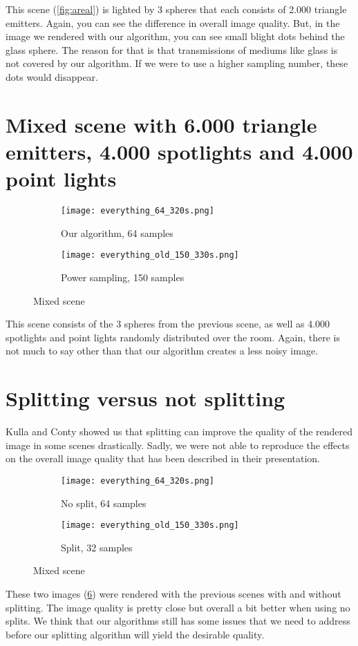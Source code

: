 This scene (\ref{fig:areal}) is lighted by 3 spheres that each consists of 2.000 triangle emitters. Again, you can see the difference in overall image quality. But, in the image we rendered with our algorithm, you can see small blight dots behind the glass sphere. The reason for that is that transmissions of mediums like glass is not covered by our algorithm. If we were to use a higher sampling number, these dots would disappear.

\section{Mixed scene with 6.000 triangle emitters, 4.000 spotlights and 4.000 point lights}

\begin{figure}
	\centering
	\begin{subfigure}{.5\textwidth}
		\centering
		\texttt{[image: everything\_64\_320s.png]}
		\caption{Our algorithm, 64 samples}
		\label{fig:every1}
	\end{subfigure}%
	\begin{subfigure}{.5\textwidth}
		\centering
		\texttt{[image: everything\_old\_150\_330s.png]}
		\caption{Power sampling, 150 samples}
		\label{fig:every2}
	\end{subfigure}
	\caption{Mixed scene}
	\label{fig:every}
\end{figure}

This scene consists of the 3 spheres from the previous scene, as well as 4.000 spotlights and point lights randomly distributed over the room. Again, there is not much to say other than that our algorithm creates a less noisy image.

\section{Splitting versus not splitting}

Kulla and Conty \Cite{MLS} showed us that splitting can improve the quality of the rendered image in some scenes drastically. Sadly, we were not able to reproduce the effects on the overall image quality that has been described in their presentation.

\begin{figure}
	\centering
	\begin{subfigure}{.5\textwidth}
		\centering
		\texttt{[image: everything\_64\_320s.png]}
		\caption{No split, 64 samples}
		\label{fig:every3}
	\end{subfigure}%
	\begin{subfigure}{.5\textwidth}
		\centering
		\texttt{[image: everything\_old\_150\_330s.png]}
		\caption{Split, 32 samples}
		\label{fig:every4}
	\end{subfigure}
	\caption{Mixed scene}
	\label{fig:everyt}
\end{figure}

These two images (\ref{fig:everyt}) were rendered with the previous scenes with and without splitting. The image quality is pretty close but overall a bit better when using no splits. We think that our algorithms still has some issues that we need to address before our splitting algorithm will yield the desirable quality.
